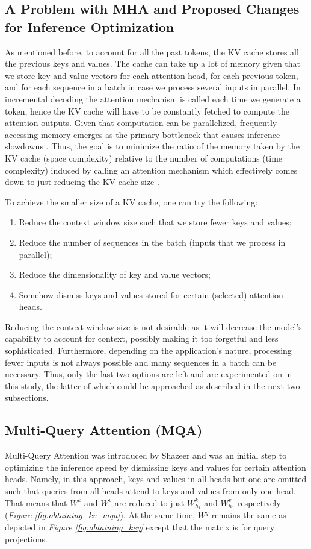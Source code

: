 \subsection{A Problem with MHA and Proposed Changes for Inference Optimization}
As mentioned before, to account for all the past tokens, the KV cache stores all the previous keys and values. The cache can take up a lot of memory given that we store key and value vectors for each attention head, for each previous token, and for each sequence in a batch in case we process several inputs in parallel. In incremental decoding the attention mechanism is called each time we generate a token, hence the KV cache will have to be constantly fetched to compute the attention outputs. Given that computation can be parallelized, frequently accessing memory emerges as the primary bottleneck that causes inference slowdowns \cite{pope_efficiently_2022} \cite{shazeer_fast_2019} \cite{williams_roofline_2009}. Thus, the goal is to minimize the ratio of the memory taken by the KV cache (space complexity) relative to the number of computations (time complexity) induced by calling an attention mechanism which effectively comes down to just reducing the KV cache size \cite{shazeer_fast_2019}. 

To achieve the smaller size of a KV cache, one can try the following:
\begin{enumerate}
    \item Reduce the context window size such that we store fewer keys and values;
    \item Reduce the number of sequences in the batch (inputs that we process in parallel);
    \item Reduce the dimensionality of key and value vectors;
    \item Somehow dismiss keys and values stored for certain (selected) attention heads.
\end{enumerate}
Reducing the context window size is not desirable as it will decrease the model's capability to account for context, possibly making it too forgetful and less sophisticated. Furthermore, depending on the application's nature, processing fewer inputs is not always possible and many sequences in a batch can be necessary. Thus, only the last two options are left and are experimented on in this study, the latter of which could be approached as described in the next two subsections.


\subsection{Multi-Query Attention (MQA)}
Multi-Query Attention was introduced by Shazeer \cite{shazeer_fast_2019} and was an initial step to optimizing the inference speed by dismissing keys and values for certain attention heads. Namely, in this approach, keys and values in all heads but one are omitted such that queries from all heads attend to keys and values from only one head. That means that $W^k$ and $W^v$ are reduced to just $W_{h_{1}}^{k}$ and $W_{h_{1}}^{v}$ respectively (\textit{Figure \ref{fig:obtaining_kv_mqa}}). At the same time, $W^q$ remains the same as depicted in \textit{Figure \ref{fig:obtaining_key}} except that the matrix is for query projections.

